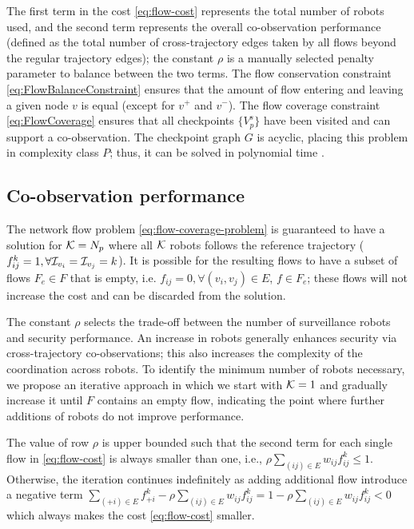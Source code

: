 \documentclass[10pt,twocolumn,twoside]{IEEEtran}
\newcommand{\news}{\color{blue}}
\begin{document}
The first term in the cost \eqref{eq:flow-cost} represents the total number of robots used, and the second term represents the overall co-observation performance (defined as the total number of cross-trajectory edges taken by all flows beyond the regular trajectory edges); the constant $\rho$ is a manually selected penalty parameter to balance between the two terms. 
{\news The flow conservation constraint \eqref{eq:FlowBalanceConstraint} ensures that the amount of flow entering and leaving a given node $v$ is equal (except for $v^{+}$ and $v^{-}$). The flow coverage constraint \eqref{eq:FlowCoverage} ensures that all checkpoints $ \{V^{s}_{p}\}$ have been visited and can support a co-observation. The checkpoint graph $G$ is acyclic, placing this problem in complexity class $P$; thus, it can be solved in polynomial time \cite{1702662}. }

\subsection{Co-observation performance}
The network flow problem \eqref{eq:flow-coverage-problem} is guaranteed to have a solution for $\mathcal{K}=N_{p}$ where all $\mathcal{K}$ robots follows the reference trajectory ($f^{k}_{ij}=1, \forall \mathcal{I}_{v_{i}}=\mathcal{I}_{v_{j}}=k$).  %
It is possible for the resulting flows to have a subset of flows $F_{e} \in F$ that is empty, i.e. $f_{ij}=0, \forall (v_{i},v_{j})\in E$, $f\in F_{e}$; these flows will not increase the cost and can be discarded from the solution.  

The constant $\rho$ selects the trade-off between the number of surveillance robots and security performance. An increase in robots generally enhances security via cross-trajectory co-observations; this also increases the complexity of the coordination across robots. To identify the minimum number of robots necessary, we propose an iterative approach in which we start with $\mathcal{K}=1$ and gradually increase it until $F$ contains an empty flow, indicating the point where further additions of robots do not improve performance. 

\begin{remark} 
The value of row $\rho$ is upper bounded such that the second term for each single flow in \eqref{eq:flow-cost} is always smaller than one, i.e., $ \rho \sum_{(ij)\in E} w_{ij} f^k_{ij}\leq 1$. Otherwise, the iteration continues indefinitely as adding additional flow introduce a negative term $\sum_{(+i)\in E} f^{k}_{+i} - \rho\sum_{(ij)\in E} w_{ij} f^k_{ij} = 1- \rho\sum_{(ij)\in E} w_{ij} f^k_{ij}<0$ which always makes the cost \eqref{eq:flow-cost} smaller.
\end{remark}
\end{document}
